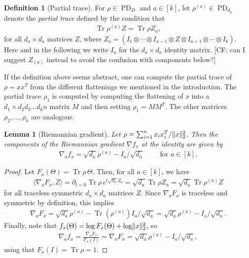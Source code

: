 \documentclass[aos]{imsart}
\newtheorem{lemma}[theorem]{Lemma}
\theoremstyle{definition}
\newtheorem{definition}[theorem]{Definition}
\numberwithin{equation}{section}
\DeclareMathOperator{\tr}{Tr}
\DeclareMathOperator{\PD}{PD}
\DeclarePairedDelimiter{\norm}{\lVert}{\rVert}
\newcommand{\ot}{\otimes}
\newcommand{\samp}{x}
\newcommand{\CF}[1]{{\color{purple}[CF: #1]}}
\newcommand{\MW}[1]{{\color{red}[MW: #1]}}
\begin{document}
\begin{definition}[Partial trace]\label{def:single marginal}
For $\rho \in \PD_D$ and $a\in[k]$, let $\rho^{(a)} \in \PD_{d_a}$ denote the \emph{partial trace} defined by the condition that
\begin{align*}
  \tr \rho^{(a)} Z = \tr \rho Z_a,
\end{align*}
for all $d_a \times d_a$ matrices $Z$, where $Z_a = (I_1 \ot \cdots \ot I_{a-1} \ot Z \ot I_{a+1} \ot \cdots \ot I_k)$.
Here and in the following we write $I_a$ for the $d_a\times d_a$ identity matrix. \CF{can I suggest $Z_{(a)}$ instead to avoid the confusion with components below?}
\end{definition}

If the definition above seems abstract, one can compute the partial trace of $\rho = \samp \samp^T$ from the different flattenings we mentioned in the introduction. The partial trace $\rho_1$ is computed by computing the flattening of $\samp$ into a $d_1\times d_2 d_3 \dots d_k n$ matrix $M$ and then setting $\rho_1 = M M^T$. The other matrices $\rho_2, \dots, \rho_k$ are analogous.


\begin{lemma}[Riemannian gradient]\label{lem:gradient}
Let $\rho = \sum_{i=1}^n \samp_i \samp_i^T / \norm{\samp}_2^2$.
Then the components of the Riemannian gradient $\nabla f_{\samp}$ at the identity are given by
\begin{align*}
  \nabla_a f_{\samp} = \sqrt{d_a} \rho^{(a)} - I_a/\sqrt{d_a} \qquad \text{ for } a \in [k].
\end{align*}
\end{lemma}
\begin{proof}
  Let $F_{\samp}(\Theta) = \tr \rho \, \Theta$.
  Then, for all $a\in[k]$, we have
  \begin{align*}
   \langle \nabla_a F_{\samp} , Z \rangle
  = \partial_{t=0} \tr \rho \, e^{t \sqrt{d_a} Z_a}
  = \sqrt{d_a} \tr \rho Z_a
  = \sqrt{d_a} \tr \rho^{(a)} Z
  \end{align*}
  for all traceless symmetric $d_a \times d_a$ matrices $Z$.
  Since $\nabla_a F_{\samp}$ is traceless and symmetric by definition, this implies
  \begin{align*}
    \nabla_a F_{\samp}
  = \sqrt{d_a} \rho^{(a)} - \tr(\rho^{(a)}) I_a /\sqrt{d_a}
  = \sqrt{d_a} \rho^{(a)} - I_a/\sqrt{d_a}.
  \end{align*}
  Finally, note that $f_{\samp}(\Theta) = \log F_{\samp}(\Theta) + \log \norm{\samp}_2^2$, so
  \begin{align*}
    \nabla_a f_{\samp}
  = \frac{\nabla_a F_{\samp}}{F_{\samp}(I)}
  = \nabla_a F_{\samp}
  = \sqrt{d_a} \rho^{(a)} - I_a/\sqrt{d_a},
  \end{align*}
  using that $F_{\samp}(I) = \tr \rho = 1$.
\end{proof}
\end{document}
